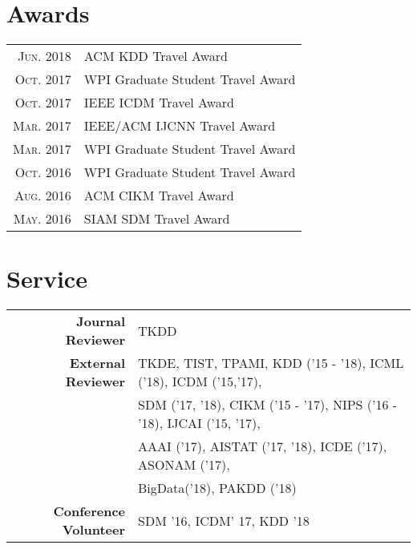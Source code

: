 \documentclass[a4paper,10pt]{article} %
\begin{document}
    \section{Awards}
    \begin{tabular}{rl}
    \textsc{Jun.} 2018 & ACM KDD Travel Award \normalsize\\
    \textsc{Oct.} 2017 & WPI Graduate Student Travel Award \normalsize\\
    \textsc{Oct.} 2017 & IEEE ICDM Travel Award  \normalsize \\
    \textsc{Mar.} 2017 & IEEE/ACM IJCNN Travel Award \normalsize \\
    \textsc{Mar.} 2017 & WPI Graduate Student Travel Award \normalsize\\
    \textsc{Oct.} 2016 & WPI Graduate Student Travel Award \normalsize\\
    \textsc{Aug.} 2016 & ACM CIKM Travel Award \normalsize\\
    \textsc{May.} 2016 & SIAM SDM Travel Award \normalsize\\
    \end{tabular}
    
    \section{Service}
    \begin{tabular}{rl}	
    \textbf{Journal Reviewer} & TKDD  \\
    \textbf{External Reviewer} & TKDE, TIST, TPAMI, KDD ('15 - '18), ICML ('18), ICDM ('15,'17), \\
        & SDM ('17, '18), CIKM ('15 - '17), NIPS ('16 - '18), IJCAI ('15, '17),\\
        & AAAI ('17), AISTAT ('17, '18), ICDE ('17), ASONAM ('17),\\
        & BigData('18), PAKDD ('18) \\
    \textbf{Conference Volunteer} & SDM '16, ICDM' 17, KDD '18
    \end{tabular}
    
    
\end{document}
